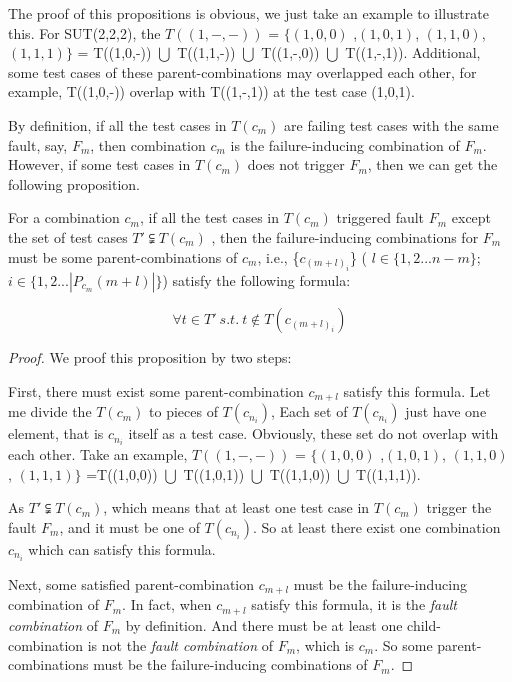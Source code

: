 \documentclass{sig-alternate}
\begin{document}
The proof of this propositions is obvious, we just take an example to illustrate this. For SUT(2,2,2), the $T((1,-,-))$ = $\{(1,0,0)$ ,$(1,0,1)$, $(1,1,0)$, $(1,1,1)\}$ =  T((1,0,-)) $\bigcup$ T((1,1,-)) $\bigcup$ T((1,-,0)) $\bigcup$ T((1,-,1)). Additional, some test cases of these parent-combinations may overlapped each other, for example, T((1,0,-)) overlap with T((1,-,1)) at the test case (1,0,1).

By definition, if all the test cases in $T(c_{m})$ are failing test cases with the same fault, say,  $F_{m}$, then combination $c_{m}$ is the failure-inducing combination of $F_{m}$. However, if some test cases in $T(c_{m})$ does not trigger $F_{m}$, then we can get the following proposition.

\begin{proposition}
For a combination $c_{m}$, if all the test cases in $T(c_{m})$ triggered fault $F_{m}$ except the set of test cases $T' \subsetneqq T(c_{m})$ , then the failure-inducing combinations for $F_{m}$ must be some parent-combinations of $c_{m}$, i.e., \{$c_{(m+l)_{i}}$\} (  $l \in \{1, 2... n-m\}$;   $i \in \{1,2 ... |P_{c_{m}}(m+l)| \}$) satisfy the following formula:

\begin{displaymath}  \forall t \in T'\ s.t.\ t \notin T(c_{(m+l)_{i}})\end{displaymath}

\end{proposition}


\begin{proof}

We proof this proposition by two steps:

First, there must exist some parent-combination $c_{m+l}$ satisfy this formula. Let me divide the $T(c_{m})$ to pieces of $T(c_{n_{i}})$, Each set of $T(c_{n_{i}})$ just have one element, that is $c_{n_{i}}$ itself as a test case. Obviously, these set do not overlap with each other. Take an example, $T((1,-,-))$ = $\{(1,0,0)$ ,$(1,0,1)$, $(1,1,0)$, $(1,1,1)\}$ =T((1,0,0)) $\bigcup$ T((1,0,1)) $\bigcup$ T((1,1,0)) $\bigcup$ T((1,1,1)).

As $T' \subsetneqq T(c_{m})$, which means that at least one test case in $T(c_{m})$ trigger the fault $F_{m}$, and it must be one of $T(c_{n_{i}})$. So at least there exist one combination $c_{n_{i}}$ which can satisfy this formula.

Next, some satisfied parent-combination $c_{m+l}$ must be the failure-inducing combination of $F_{m}$. In fact, when $c_{m+l}$ satisfy this formula, it is the \emph{fault combination} of $F_{m}$ by definition. And there must be at least one child-combination is not the \emph{fault combination} of $F_{m}$, which is $c_{m}$. So some parent-combinations must be the failure-inducing combinations of $F_{m}$. %
\end{proof}
\end{document}
